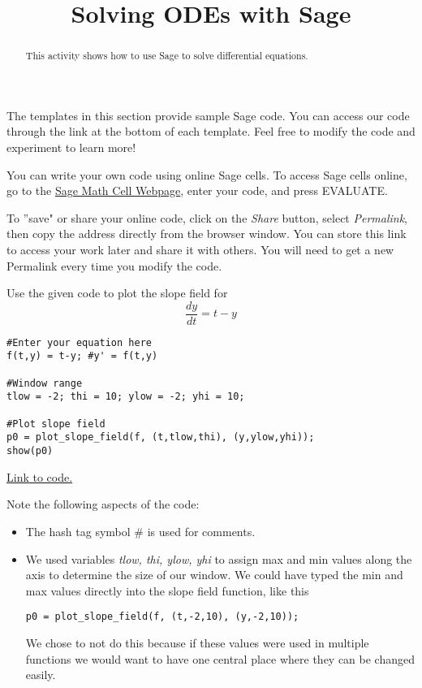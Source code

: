 \documentclass{ximera}
\title{Solving ODEs with Sage}
\begin{document}
\begin{abstract}
This activity shows how to use Sage to solve differential equations.

\end{abstract}

\maketitle

The templates in this section provide sample Sage code. You can access our code through the link at the bottom of each template.  Feel free to modify the code and experiment to learn more! 
 
You can write your own code using online Sage cells.  To access Sage cells online, go to the \href{https://sagecell.sagemath.org/}{Sage Math Cell Webpage}, enter your code, and press EVALUATE. 
 
To ''save" or share your online code, click on the \emph{Share} button, select \emph{Permalink}, then copy the address directly from the browser window.  You can store this link to access your work later and share it with others.  You will need to get a new Permalink every time you modify the code.

\begin{example}\label{ex:SageSlopeField}
    Use the given code to plot the slope field for 
    $$\frac{dy}{dt}=t-y$$

    \begin{verbatim}
#Enter your equation here
f(t,y) = t-y; #y' = f(t,y)

#Window range
tlow = -2; thi = 10; ylow = -2; yhi = 10;

#Plot slope field 
p0 = plot_slope_field(f, (t,tlow,thi), (y,ylow,yhi));
show(p0)
    \end{verbatim}
\href{https://sagecell.sagemath.org/?z=eJxFjTELgzAQhfdA_sMDhxqIYLtKtzq3dOkogokJhCSNEcm_72kp3d597-67qvdZJZSwJqj3OmYbPIxKijNdZ1kErshN6VA97WwyFjspBI37rUc5Ufnd4oyz6mX9FDak0c90nh3lK5pLh2wspXPbofxh-cHj9uECyV2ICtoqN4Gz2FIfiQ8HHw5eawn6uMslaQVNRe5WST4hSLaYsNWxFR_c9EEC&lang=sage&interacts=eJyLjgUAARUAuQ==}{Link to code.}

\begin{observation}
    Note the following aspects of the code:
    \begin{itemize}
        \item The hash tag symbol \# is used for comments.  
        \item We used variables \textit{tlow, thi, ylow, yhi} to assign max and min values along the axis to determine the size of our window.  We could have typed the min and max values directly into the slope field function, like this
        \begin{verbatim}p0 = plot_slope_field(f, (t,-2,10), (y,-2,10));\end{verbatim}
        We chose to not do this because if these values were used in multiple functions we would want to have one central place where they can be changed easily.
    \end{itemize}
\end{observation}
\end{example}   
\end{document}
